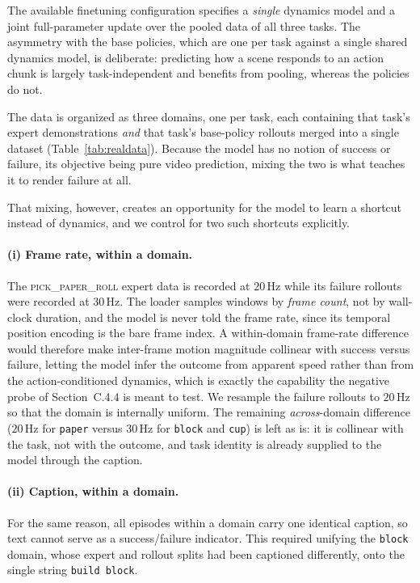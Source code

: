 \documentclass[letterpaper]{article} %
\begin{document}
The available finetuning configuration specifies a \emph{single} dynamics model
and a joint full-parameter update over the pooled data of all three tasks. The
asymmetry with the base policies, which are one per task against a single
shared dynamics model, is deliberate: predicting how a scene responds to an
action chunk is largely task-independent and benefits from pooling, whereas the
policies do not.

The data is organized as three domains, one per task, each containing that task's
expert demonstrations \emph{and} that task's base-policy rollouts merged into a
single dataset (Table~\ref{tab:realdata}). Because the model has no notion of
success or failure, its objective being pure video prediction, mixing the two is
what teaches it to render failure at all.

That mixing, however, creates an opportunity for the model to learn a shortcut
instead of dynamics, and we control for two such shortcuts explicitly.

\paragraph{(i) Frame rate, within a domain.}
The \textsc{pick\_paper\_roll} expert data is recorded at $20$\,Hz while its
failure rollouts were recorded at $30$\,Hz. The loader samples windows by
\emph{frame count}, not by wall-clock duration, and the model is never told the
frame rate, since its temporal position encoding is the bare frame index. A
within-domain frame-rate difference would therefore make inter-frame motion
magnitude collinear with success versus failure, letting the model infer the
outcome from apparent speed rather than from the action-conditioned dynamics,
which is exactly the capability the negative probe of Section~C.4.4 is meant to
test. We resample the failure rollouts to $20$\,Hz so that the domain is
internally uniform. The remaining \emph{across}-domain difference
($20$\,Hz for \texttt{paper} versus $30$\,Hz for \texttt{block} and
\texttt{cup}) is left as is: it is collinear with the task, not with the
outcome, and task identity is already supplied to the model through the caption.

\paragraph{(ii) Caption, within a domain.}
For the same reason, all episodes within a domain carry one identical caption, so
text cannot serve as a success/failure indicator. This required unifying the
\texttt{block} domain, whose expert and rollout splits had been captioned
differently, onto the single string \texttt{build block}.
\end{document}

